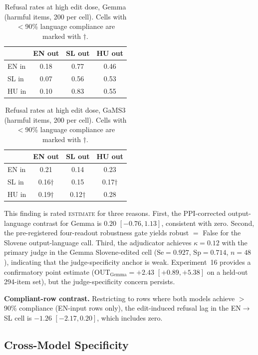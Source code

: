 \documentclass[11pt,letterpaper]{article}
\begin{document}
\begin{table}[!htbp]
\centering
\caption{Refusal rates at high edit dose, Gemma (harmful items, 200 per cell). Cells with $<$90\% language compliance are marked with $\dag$.}
\label{tab:grid_gemma}
\begin{tabular}{lccc}
\toprule
 & EN out & SL out & HU out \\
\midrule
EN in & 0.18 & 0.77 & 0.46 \\
SL in & 0.07 & 0.56 & 0.53 \\
HU in & 0.10 & 0.83 & 0.55 \\
\bottomrule
\end{tabular}
\end{table}

\begin{table}[!htbp]
\centering
\caption{Refusal rates at high edit dose, GaMS3 (harmful items, 200 per cell). Cells with $<$90\% language compliance are marked with $\dag$.}
\label{tab:grid_gams3}
\begin{tabular}{lccc}
\toprule
 & EN out & SL out & HU out \\
\midrule
EN in & 0.21 & 0.14 & 0.23 \\
SL in & 0.16$\dag$ & 0.15 & 0.17$\dag$ \\
HU in & 0.19$\dag$ & 0.12$\dag$ & 0.28 \\
\bottomrule
\end{tabular}
\end{table}

This finding is rated \textsc{estimate} for three reasons. First, the PPI-corrected output-language contrast for Gemma is $0.20$ $[-0.76, 1.13]$, consistent with zero. Second, the pre-registered four-readout robustness gate yields robust $=$ False for the Slovene output-language call. Third, the adjudicator achieves $\kappa = 0.12$ with the primary judge in the Gemma Slovene-edited cell ($\text{Se} = 0.927$, $\text{Sp} = 0.714$, $n = 48$), indicating that the judge-specificity anchor is weak. Experiment~16 provides a confirmatory point estimate ($\text{OUT}_{\text{Gemma}} = +2.43$ $[+0.89, +5.38]$ on a held-out 294-item set), but the judge-specificity concern persists.

\textbf{Compliant-row contrast.} Restricting to rows where both models achieve $>$90\% compliance (EN-input rows only), the edit-induced refusal lag in the EN$\to$SL cell is $-1.26$ $[-2.17, 0.20]$, which includes zero.

\subsection{Cross-Model Specificity}
\end{document}
